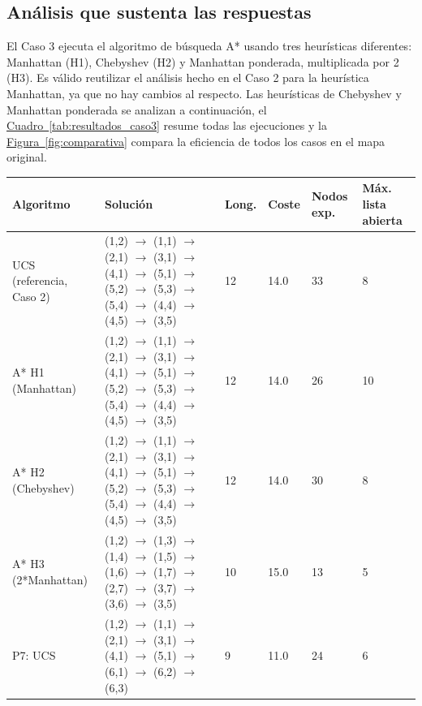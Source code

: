 \documentclass[12pt,a4paper]{article}
\begin{document}
\subsection{Análisis que sustenta las respuestas}
El Caso 3 ejecuta el algoritmo de búsqueda A* usando tres heurísticas diferentes: Manhattan (H1), Chebyshev (H2) y Manhattan ponderada, multiplicada por 2 (H3). Es válido reutilizar el análisis hecho en el Caso 2 para la heurística Manhattan, ya que no hay cambios al respecto. Las heurísticas de Chebyshev y Manhattan ponderada se analizan a continuación, el \hyperref[tab:resultados_caso3]{Cuadro~\ref*{tab:resultados_caso3}} resume todas las ejecuciones y la \hyperref[fig:comparativa]{Figura~\ref*{fig:comparativa}} compara la eficiencia de todos los casos en el mapa original.\\
\begin{table}[!t]
\centering
\small
\begin{tabularx}{\textwidth}{|>{\raggedright\arraybackslash}p{2.0cm}|>{\raggedright\arraybackslash}X|C{1.1cm}|C{1.1cm}|C{1.3cm}|C{1.5cm}|}
\hline
\textbf{Algoritmo} & \textbf{Solución} & \textbf{Long.} & \textbf{Coste} & \textbf{Nodos exp.} & \textbf{Máx. lista abierta} \\ \hline
UCS (referencia, Caso 2) & (1,2) $\rightarrow$ (1,1) $\rightarrow$ (2,1) $\rightarrow$ (3,1) $\rightarrow$ (4,1) $\rightarrow$ (5,1) $\rightarrow$ (5,2) $\rightarrow$ (5,3) $\rightarrow$ (5,4) $\rightarrow$ (4,4) $\rightarrow$ (4,5) $\rightarrow$ (3,5) & 12 & 14.0 & 33 & 8 \\ \hline
A* H1 (Manhattan) & (1,2) $\rightarrow$ (1,1) $\rightarrow$ (2,1) $\rightarrow$ (3,1) $\rightarrow$ (4,1) $\rightarrow$ (5,1) $\rightarrow$ (5,2) $\rightarrow$ (5,3) $\rightarrow$ (5,4) $\rightarrow$ (4,4) $\rightarrow$ (4,5) $\rightarrow$ (3,5) & 12 & 14.0 & 26 & 10 \\ \hline
A* H2 (Chebyshev) & (1,2) $\rightarrow$ (1,1) $\rightarrow$ (2,1) $\rightarrow$ (3,1) $\rightarrow$ (4,1) $\rightarrow$ (5,1) $\rightarrow$ (5,2) $\rightarrow$ (5,3) $\rightarrow$ (5,4) $\rightarrow$ (4,4) $\rightarrow$ (4,5) $\rightarrow$ (3,5) & 12 & 14.0 & 30 & 8 \\ \hline
A* H3 (2*Manhattan) & (1,2) $\rightarrow$ (1,3) $\rightarrow$ (1,4) $\rightarrow$ (1,5) $\rightarrow$ (1,6) $\rightarrow$ (1,7) $\rightarrow$ (2,7) $\rightarrow$ (3,7) $\rightarrow$ (3,6) $\rightarrow$ (3,5) & 10 & 15.0 & 13 & 5 \\ \hline
P7: UCS & (1,2) $\rightarrow$ (1,1) $\rightarrow$ (2,1) $\rightarrow$ (3,1) $\rightarrow$ (4,1) $\rightarrow$ (5,1) $\rightarrow$ (6,1) $\rightarrow$ (6,2) $\rightarrow$ (6,3) & 9 & 11.0 & 24 & 6 \\ \hline

\end{tabularx}
\end{table}
\end{document}

